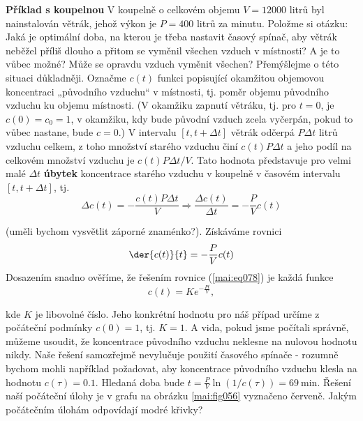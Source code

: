 \begin{mdframed}[style=mdexam]
  \begin{example}\label{mai:exam085}
    \textbf{Příklad s koupelnou}\newline
      V koupelně o celkovém objemu \(V = \num{12000}\) litrů byl nainstalován větrák, jehož výkon je
      \(P = \num{400}\) litrů za minutu. Položme si otázku: Jaká je optimální doba, na kterou je
      třeba nastavit časový spínač, aby větrák neběžel příliš dlouho a přitom se vyměnil všechen
      vzduch v místnosti? A je to vůbec možné? Může se opravdu vzduch vyměnit všechen? Přemýšlejme o
      této situaci důkladněji. Označme \(c(t)\) funkci popisující okamžitou objemovou koncentraci
      „původního vzduchu“ v místnosti, tj. poměr objemu původního vzduchu ku objemu místnosti. (V
      okamžiku zapnutí větráku, tj. pro \(t = 0\), je \(c(0) = c_0 = 1\), v okamžiku, kdy bude
      původní vzduch zcela vyčerpán, pokud to vůbec nastane, bude \(c = 0\).) V intervalu \([t,t +
      \Delta t]\) větrák odčerpá \(P\Delta t\) litrů vzduchu celkem, z toho množství starého vzduchu
      činí \(c(t)P\Delta t\) a jeho podíl na celkovém množství vzduchu je \(c(t)P\Delta t/V\). Tato
      hodnota představuje pro velmi malé \(\Delta t\) \textbf{úbytek} koncentrace starého vzduchu v
      koupelně v časovém intervalu \([t, t + \Delta t]\), tj.
      \begin{equation*}
        \Delta c(t) = - \frac{c(t)P\Delta t}{V} \Rightarrow 
        \dfrac{\Delta c(t)}{\Delta t} = - \dfrac{P}{V}c(t)
      \end{equation*}
      
      (uměli bychom vysvětlit záporné znaménko?). Získáváme rovnici
      \begin{equation}\label{mai:eq078}
        \der{c(t)}{t} = - \dfrac{P}{V}c(t)
      \end{equation}
      Dosazením snadno ověříme, že řešením rovnice (\ref{mai:eq078}) je každá funkce
      \begin{equation*}
        c(t) = Ke^{-\frac{Pt}{V}},
      \end{equation*}

      {\centering
      \captionsetup{type=figure}
      \label{mai:fig056}
      \par}
      
      kde \(K\) je libovolné číslo. Jeho konkrétní hodnotu pro náš případ určíme z počáteční
      podmínky \(c(0) = 1\), tj. \(K = 1\). A vida, pokud jsme počítali správně, můžeme usoudit, že
      koncentrace původního vzduchu neklesne na nulovou hodnotu nikdy. Naše řešení samozřejmě
      nevylučuje použití časového spínače - rozumně bychom mohli například požadovat, aby
      koncentrace původního vzduchu klesla na hodnotu \(c(\tau) = \num{0.1}\). Hledaná doba bude \(t
      =\frac{P}{V}\ln(1/c(\tau)) =\qty{69}{\minute}\). Řešení naší počáteční úlohy je v grafu na
      obrázku \ref{mai:fig056} vyznačeno červeně. Jakým počátečním úlohám odpovídají modré křivky?
  \end{example}
\end{mdframed}